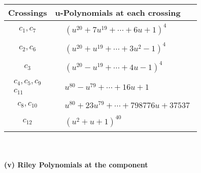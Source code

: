 \documentclass[1p]{elsarticle_modified}
\theoremstyle{definition}
\begin{document}
\begin{tabular}{m{50pt}|m{274pt}}
Crossings & \hspace{64pt}u-Polynomials at each crossing \\
\hline $$\begin{aligned}c_{1},c_{7}\end{aligned}$$&$\begin{aligned}
&(u^{20}+7 u^{19}+\cdots+6 u+1)^{4}
\end{aligned}$\\
\hline $$\begin{aligned}c_{2},c_{6}\end{aligned}$$&$\begin{aligned}
&(u^{20}+u^{19}+\cdots+3 u^2-1)^{4}
\end{aligned}$\\
\hline $$\begin{aligned}c_{3}\end{aligned}$$&$\begin{aligned}
&(u^{20}- u^{19}+\cdots+4 u-1)^{4}
\end{aligned}$\\
\hline $$\begin{aligned}c_{4},c_{5},c_{9}\\c_{11}\end{aligned}$$&$\begin{aligned}
&u^{80}- u^{79}+\cdots+16 u+1
\end{aligned}$\\
\hline $$\begin{aligned}c_{8},c_{10}\end{aligned}$$&$\begin{aligned}
&u^{80}+23 u^{79}+\cdots+798776 u+37537
\end{aligned}$\\
\hline $$\begin{aligned}c_{12}\end{aligned}$$&$\begin{aligned}
&(u^2+u+1)^{40}
\end{aligned}$\\
\hline
\end{tabular}\\~\\
\newpage\renewcommand{\arraystretch}{1}
\flushleft \textbf{(v) Riley Polynomials at the component}\newline \\
\end{document}
